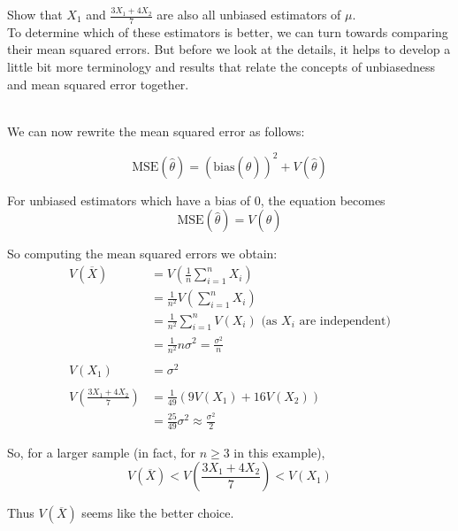 \exercise Show that $X_1$ and $\frac{3X_1 + 4X_2}{7}$ are also all unbiased estimators of $\mu$.\\

To determine which of these estimators is better, we can turn towards comparing their mean squared errors. But before we look at the details, it helps to develop a little bit more terminology and results that relate the concepts of unbiasedness and mean squared error together. 

\\

We can now rewrite the mean squared error as follows:

\[
\text{MSE}(\hat{\theta}) = 
(\text{bias}(\hat{\theta}))^2 + V(\hat{\theta})
\]

For unbiased estimators which have a bias of $0$, the equation becomes
\[
\text{MSE}(\hat{\theta}) = 
V(\hat\theta) 
\]

So computing the mean squared errors we obtain: 
\begin{align*}
    V(\overline{X}) 
    &= V\left(\frac{1}{n}\sum_{i=1}^n X_i\right) \\
    &= \frac{1}{n^2} V\left(\sum_{i=1}^n X_i\right) \\
    &= \frac{1}{n^2} \sum_{i=1}^n V(X_i) \text{ (as } X_i \text{ are independent)} \\
    &= \frac{1}{n^2} n\sigma^2 = \frac{\sigma^2}{n}\\
    \\
    V(X_1) &= \sigma^2 \\
    \\
    V\left(\frac{3X_1 + 4X_2}{7}\right) &=
    \frac{1}{49} \left(9V(X_1) + 16 V(X_2)\right) \\
    &= \frac{25}{49} \sigma^2 \approx \frac{\sigma^2}{2}
\end{align*}

So, for a larger sample (in fact, for $n\geq 3$ in this example), 
\[
V(\overline{X}) < V\left(\frac{3X_1 + 4X_2}{7}  \right) < V(X_1)
\]

Thus $V(\overline{X})$ seems like the better choice.

\\



